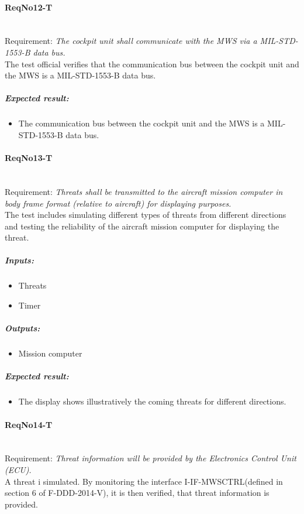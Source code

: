 \paragraph{ReqNo12-T}\mbox{}\\ %
Requirement: \textit{The cockpit unit shall communicate with the MWS via a MIL-STD-1553-B data bus.}\\
The test official verifies that the communication bus between the cockpit unit and the MWS is a MIL-STD-1553-B data bus.

\subparagraph{Expected result:}
	\begin{itemize}
	\item The communication bus between the cockpit unit and the MWS is a MIL-STD-1553-B data bus.
	\end{itemize}

\paragraph{ReqNo13-T}\mbox{}\\ %
Requirement: \textit{Threats shall be transmitted to the aircraft mission computer in body frame format (relative to aircraft) for displaying purposes.}\\
The test includes simulating different types of threats from different directions and testing the reliability of the aircraft mission computer for displaying the threat.
	\subparagraph{Inputs:}
	\begin{itemize}
	\item Threats
	\item Timer
	\end{itemize}
	\subparagraph{Outputs:}
	\begin{itemize}
	\item Mission computer
	\end{itemize}
	\subparagraph{Expected result:}
	\begin{itemize}
	\item The display shows illustratively the coming threats for different directions.
	\end{itemize}
\paragraph{ReqNo14-T}\mbox{}\\ %
Requirement: \textit{Threat information will be provided by the Electronics Control Unit (ECU).}\\
A threat i simulated. By monitoring the interface I-IF-MWSCTRL(defined in section 6 of F-DDD-2014-V), it is then verified, that threat information is provided.

